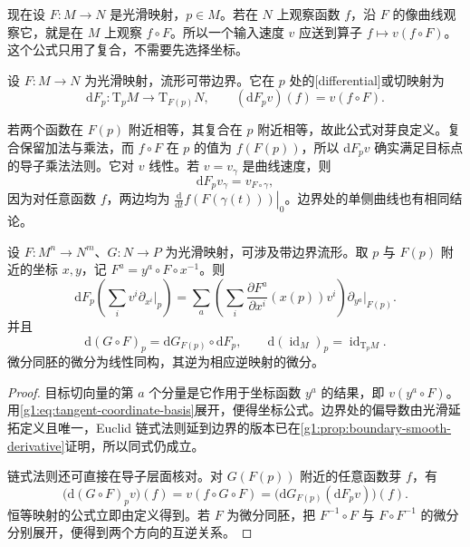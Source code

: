 现在设 \(F:M\to N\) 是光滑映射，\(p\in M\)。若在 \(N\) 上观察函数 \(f\)，沿 \(F\) 的像曲线观察它，就是在 \(M\) 上观察 \(f\circ F\)。所以一个输入速度 \(v\) 应送到算子 \(f\mapsto v(f\circ F)\)。这个公式只用了复合，不需要先选择坐标。

\begin{definition}
	\label{g1:def:manifold-differential}
	设 \(F:M\to N\) 为光滑映射，流形可带边界。它在 \(p\) 处的[differential]或切映射为
	\[
		\mathrm{d}F_p:\mathrm{T}_pM\longrightarrow \mathrm{T}_{F(p)}N,\qquad
		(\mathrm{d}F_pv)(f)=v(f\circ F).
	\]
\end{definition}

若两个函数在 \(F(p)\) 附近相等，其复合在 \(p\) 附近相等，故此公式对芽良定义。复合保留加法与乘法，而 \(f\circ F\) 在 \(p\) 的值为 \(f(F(p))\)，所以 \(\mathrm{d}F_pv\) 确实满足目标点的导子乘法法则。它对 \(v\) 线性。若 \(v=v_\gamma\) 是曲线速度，则
\[
	\mathrm{d}F_pv_\gamma=v_{F\circ\gamma},
\]
因为对任意函数 \(f\)，两边均为 \(\left.\frac{\mathrm{d}}{\mathrm{d}t}f(F(\gamma(t)))\right|_0\)。边界处的单侧曲线也有相同结论。

\begin{proposition}
	\label{g1:prop:differential-chain-rule}
	设 \(F:M^n\to N^m\)、\(G:N\to P\) 为光滑映射，可涉及带边界流形。取 \(p\) 与 \(F(p)\) 附近的坐标 \(x,y\)，记 \(F^a=y^a\circ F\circ x^{-1}\)。则
	\begin{equation}
		\label{g1:eq:manifold-differential-matrix}
		\mathrm{d}F_p\left(\sum_i v^i\partial_{x^i}|_p\right)
		=\sum_a\left(\sum_i\frac{\partial F^a}{\partial x^i}(x(p))v^i\right)
		\partial_{y^a}|_{F(p)}.
	\end{equation}
	并且
	\[
		\mathrm{d}(G\circ F)_p=\mathrm{d}G_{F(p)}\circ\mathrm{d}F_p,
		\qquad \mathrm{d}(\operatorname{id}_M)_p=\operatorname{id}_{\mathrm{T}_pM}.
	\]
	微分同胚的微分为线性同构，其逆为相应逆映射的微分。
\end{proposition}
\begin{proof}
	目标切向量的第 \(a\) 个分量是它作用于坐标函数 \(y^a\) 的结果，即 \(v(y^a\circ F)\)。用\eqref{g1:eq:tangent-coordinate-basis}展开，便得坐标公式。边界处的偏导数由光滑延拓定义且唯一，Euclid 链式法则延到边界的版本已在\cref{g1:prop:boundary-smooth-derivative}证明，所以同式仍成立。

	链式法则还可直接在导子层面核对。对 \(G(F(p))\) 附近的任意函数芽 \(f\)，有
	\[
		\bigl(\mathrm{d}(G\circ F)_p v\bigr)(f)
		=v(f\circ G\circ F)
		=\bigl(\mathrm{d}G_{F(p)}(\mathrm{d}F_pv)\bigr)(f).
	\]
	恒等映射的公式立即由定义得到。若 \(F\) 为微分同胚，把 \(F^{-1}\circ F\) 与 \(F\circ F^{-1}\) 的微分分别展开，便得到两个方向的互逆关系。
\end{proof}

